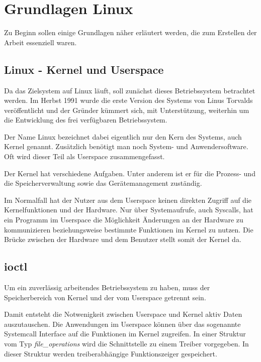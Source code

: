 \chapter{Grundlagen Linux} \label{sec:grund}
Zu Beginn sollen einige Grundlagen näher erläutert werden, die zum Erstellen der Arbeit essenziell waren.

\section{Linux - Kernel und Userspace}\label{sec:linux}
Da das Zielsystem auf Linux läuft, soll zunächst dieses Betriebssystem betrachtet werden. 
Im Herbst 1991 wurde die erste Version des Systems von Linus Torvalds veröffentlicht und der Gründer kümmert sich, mit Unterstützung, weiterhin um die Entwicklung des frei verfügbaren Betriebssystem. %
 
Der Name Linux bezeichnet dabei eigentlich nur den Kern des Systems, auch Kernel genannt. Zusätzlich benötigt man noch System- und Anwendersoftware. Oft wird dieser Teil als Userspace zusammengefasst. \citep[S. 46]{plotner2012linux} 

Der Kernel hat verschiedene Aufgaben. Unter anderem ist er für die Prozess- und die Speicherverwaltung sowie das Gerätemanagement zuständig. \citep[S. 234]{schroder2009embedded} 

Im Normalfall hat der Nutzer aus dem Userspace keinen direkten Zugriff auf die Kernelfunktionen und der Hardware. Nur über Systemaufrufe, auch Syscalls, hat ein Programm im Userspace die Möglichkeit Änderungen an der Hardware zu kommunizieren beziehungsweise bestimmte Funktionen im Kernel zu nutzen. \citep[S. 124]{plotner2012linux} 
Die Brücke zwischen der Hardware und dem Benutzer stellt somit der Kernel da.


\section{\acl{ioctl}}\label{sec:ioctl_t}
Um ein zuverlässig arbeitendes Betriebssystem zu haben, muss der Speicherbereich von Kernel und der vom Userspace getrennt sein. \citep[S. 233]{schroder2009embedded} %

Damit entsteht die Notwenigkeit zwischen Userspace und Kernel aktiv Daten auszutauschen. Die Anwendungen im Userspace können über das sogenannte Systemcall Interface auf die Funktionen im Kernel zugreifen. In einer Struktur vom Typ \textit{file\_operations} wird die Schnittstelle zu einem Treiber vorgegeben. In dieser Struktur werden treiberabhängige Funktionszeiger gespeichert. \citep[S. 249]{schroder2009embedded} %

